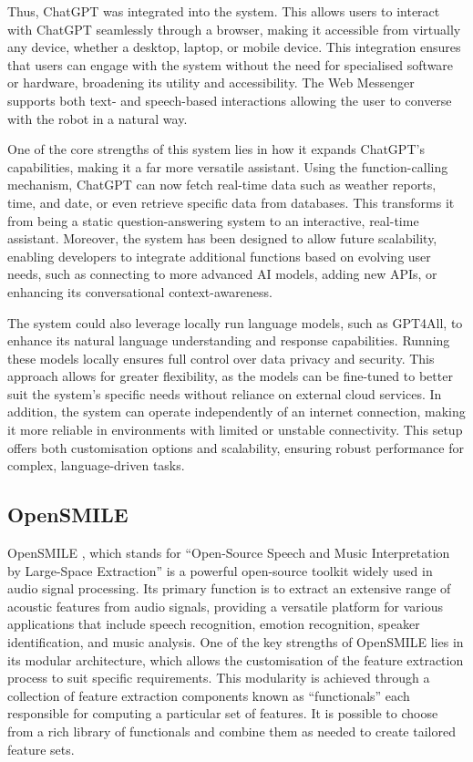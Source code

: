 Thus, ChatGPT was integrated into the system. This allows users to interact with ChatGPT seamlessly through a browser, making it accessible from virtually any device, whether a desktop, laptop, or mobile device. This integration ensures that users can engage with the system without the need for specialised software or hardware, broadening its utility and accessibility. The Web Messenger supports both text- and speech-based interactions allowing the user to converse with the robot in a natural way.

One of the core strengths of this system lies in how it expands ChatGPT's capabilities, making it a far more versatile assistant. Using the function-calling mechanism, ChatGPT can now fetch real-time data such as weather reports, time, and date, or even retrieve specific data from databases. This transforms it from being a static question-answering system to an interactive, real-time assistant. Moreover, the system has been designed to allow future scalability, enabling developers to integrate additional functions based on evolving user needs, such as connecting to more advanced AI models, adding new APIs, or enhancing its conversational context-awareness.

The system could also leverage locally run language models, such as GPT4All, to enhance its natural language understanding and response capabilities. Running these models locally ensures full control over data privacy and security. This approach allows for greater flexibility, as the models can be fine-tuned to better suit the system's specific needs without reliance on external cloud services. In addition, the system can operate independently of an internet connection, making it more reliable in environments with limited or unstable connectivity. This setup offers both customisation options and scalability, ensuring robust performance for complex, language-driven tasks.

\subsection{OpenSMILE}

OpenSMILE \cite{opensmile-2010}, which stands for ``Open-Source Speech and Music Interpretation by Large-Space Extraction'' is a powerful open-source toolkit widely used in audio signal processing. Its primary function is to extract an extensive range of acoustic features from audio signals, providing a versatile platform for various applications that include speech recognition, emotion recognition, speaker identification, and music analysis. One of the key strengths of OpenSMILE lies in its modular architecture, which allows the customisation of the feature extraction process to suit specific requirements. This modularity is achieved through a collection of feature extraction components known as ``functionals'' each responsible for computing a particular set of features. It is possible to choose from a rich library of functionals and combine them as needed to create tailored feature sets.

